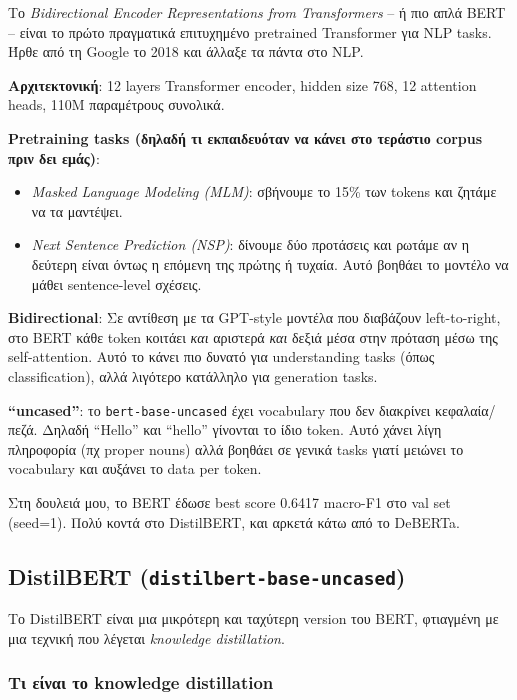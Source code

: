 \documentclass[12pt]{fphw}
\begin{document}
Το \emph{Bidirectional Encoder Representations from Transformers} -- ή πιο απλά BERT \cite{devlin2019bert} -- είναι το πρώτο πραγματικά επιτυχημένο pretrained Transformer για NLP tasks. Ήρθε από τη Google το 2018 και άλλαξε τα πάντα στο NLP.

\textbf{Αρχιτεκτονική}: 12 layers Transformer encoder, hidden size 768, 12 attention heads, 110M παραμέτρους συνολικά.

\textbf{Pretraining tasks (δηλαδή τι εκπαιδευόταν να κάνει στο τεράστιο corpus πριν δει εμάς)}:
\begin{itemize}
    \item \emph{Masked Language Modeling (MLM)}: σβήνουμε το 15\% των tokens και ζητάμε να τα μαντέψει.
    \item \emph{Next Sentence Prediction (NSP)}: δίνουμε δύο προτάσεις και ρωτάμε αν η δεύτερη είναι όντως η επόμενη της πρώτης ή τυχαία. Αυτό βοηθάει το μοντέλο να μάθει sentence-level σχέσεις.
\end{itemize}

\textbf{Bidirectional}: Σε αντίθεση με τα GPT-style μοντέλα που διαβάζουν left-to-right, στο BERT κάθε token κοιτάει \emph{και} αριστερά \emph{και} δεξιά μέσα στην πρόταση μέσω της self-attention. Αυτό το κάνει πιο δυνατό για understanding tasks (όπως classification), αλλά λιγότερο κατάλληλο για generation tasks.

\textbf{``uncased''}: το \texttt{bert-base-uncased} έχει vocabulary που δεν διακρίνει κεφαλαία/πεζά. Δηλαδή ``Hello'' και ``hello'' γίνονται το ίδιο token. Αυτό χάνει λίγη πληροφορία (πχ proper nouns) αλλά βοηθάει σε γενικά tasks γιατί μειώνει το vocabulary και αυξάνει το data per token.

Στη δουλειά μου, το BERT έδωσε best score 0.6417 macro-F1 στο val set (seed=1). Πολύ κοντά στο DistilBERT, και αρκετά κάτω από το DeBERTa.

\subsection{DistilBERT (\texttt{distilbert-base-uncased})}

Το DistilBERT \cite{sanh2019distilbert} είναι μια μικρότερη και ταχύτερη version του BERT, φτιαγμένη με μια τεχνική που λέγεται \emph{knowledge distillation}.

\subsubsection{Τι είναι το knowledge distillation}
\end{document}
